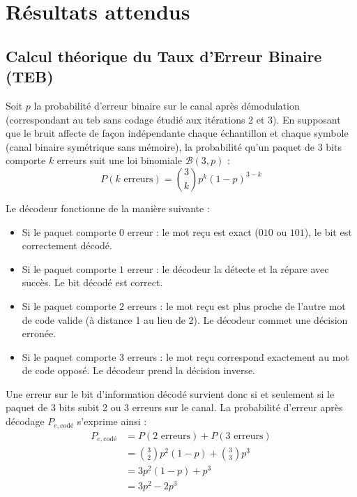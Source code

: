 \documentclass[a4paper,12pt]{report}
\begin{document}
\section{Résultats attendus}

\subsection{Calcul théorique du Taux d'Erreur Binaire (TEB)}

Soit $p$ la probabilité d'erreur binaire sur le canal après démodulation (correspondant au \gls{teb} sans codage étudié aux itérations 2 et 3). En supposant que le bruit affecte de façon indépendante chaque échantillon et chaque symbole (canal binaire symétrique sans mémoire), la probabilité qu'un paquet de 3 bits comporte $k$ erreurs suit une loi binomiale $\mathcal{B}(3, p)$ :
\[
    P(k \text{ erreurs}) = \binom{3}{k} p^k (1 - p)^{3 - k}
\]

Le décodeur fonctionne de la manière suivante :
\begin{itemize}
    \item Si le paquet comporte $0$ erreur : le mot reçu est exact ($010$ ou $101$), le bit est correctement décodé.
    \item Si le paquet comporte $1$ erreur : le décodeur la détecte et la répare avec succès. Le bit décodé est correct.
    \item Si le paquet comporte $2$ erreurs : le mot reçu est plus proche de l'autre mot de code valide (à distance 1 au lieu de 2). Le décodeur commet une décision erronée.
    \item Si le paquet comporte $3$ erreurs : le mot reçu correspond exactement au mot de code opposé. Le décodeur prend la décision inverse.
\end{itemize}

Une erreur sur le bit d'information décodé survient donc si et seulement si le paquet de 3 bits subit 2 ou 3 erreurs sur le canal. La probabilité d'erreur après décodage $P_{e,\text{codé}}$ s'exprime ainsi :
\begin{align*}
    P_{e,\text{codé}} &= P(2 \text{ erreurs}) + P(3 \text{ erreurs}) \\
                      &= \binom{3}{2} p^2 (1 - p) + \binom{3}{3} p^3 \\
                      &= 3 p^2 (1 - p) + p^3 \\
                      &= 3 p^2 - 2 p^3
\end{align*}
\end{document}
